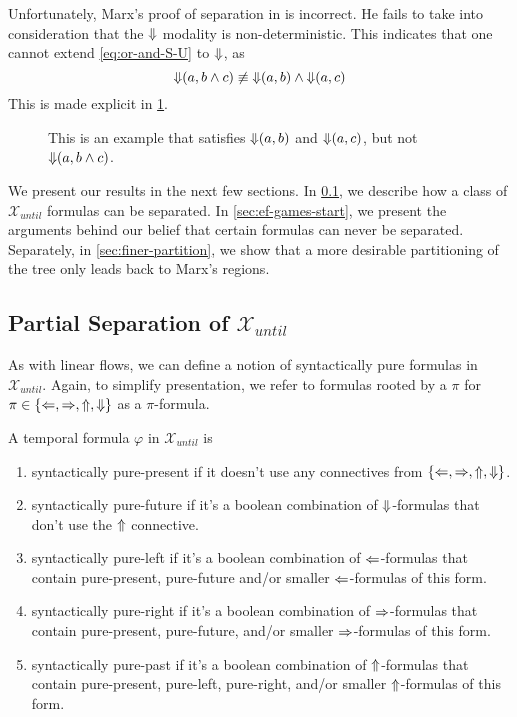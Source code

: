 \documentclass[a4paper,UKenglish,cleveref, autoref, thm-restate, numberwithinsect]{lipics-v2021}
\def\Larrow{\ensuremath\mathord{\Leftarrow}}
\def\Rarrow{\ensuremath\mathord{\Rightarrow}}
\def\Uarrow{\ensuremath\mathord{\Uparrow}}
\def\Darrow{\ensuremath\mathord{\Downarrow}}
\begin{document}
Unfortunately, Marx's proof of separation in \cite{xpathComplete} is incorrect. He fails to take into consideration that the $\Darrow$ modality is non-deterministic. This indicates that one cannot extend \cref{eq:or-and-S-U} to $\Darrow$, as
\begin{equation*}
    \Darrow(a, b \land c) \not\equiv \Darrow(a, b) \land \Darrow(a, c)
\end{equation*}
This is made explicit in \cref{fig:darrow-a-b-and-c}.
\begin{figure}[h]
    \centering
    \caption[]{This is an example that satisfies $\Darrow(a, b)$ and $\Darrow(a, c)$, but not $\Darrow(a, b \land c)$.}
    \label{fig:darrow-a-b-and-c}
\end{figure}

We present our results in the next few sections. In \cref{sec:partial-separation-start}, we describe how a class of $\mathcal{X}_{until}$ formulas can be separated. In \cref{sec:ef-games-start}, we present the arguments behind our belief that certain formulas can never be separated. Separately, in \cref{sec:finer-partition}, we show that a more desirable partitioning of the tree only leads back to Marx's regions.

\subsection{Partial Separation of $\mathcal{X}_{until}$}
\label{sec:partial-separation-start}

As with linear flows, we can define a notion of syntactically pure formulas in $\mathcal{X}_{until}$. Again, to simplify presentation, we refer to formulas rooted by a $\pi$ for $\pi \in \{\Larrow, \Rarrow, \Uarrow, \Darrow\}$ as a $\pi$-formula.
\begin{definition}
    A temporal formula $\varphi$ in $\mathcal{X}_{until}$ is
    \begin{enumerate}
        \item syntactically pure-present if it doesn't use any connectives from $\{\Larrow, \Rarrow, \Uarrow, \Darrow\}$.
        \item syntactically pure-future if it's a boolean combination of $\Darrow$-formulas that don't use the $\Uarrow$ connective.
        \item syntactically pure-left if it's a boolean combination of $\Larrow$-formulas that contain pure-present, pure-future and/or smaller $\Larrow$-formulas of this form.
        \item syntactically pure-right if it's a boolean combination of $\Rarrow$-formulas that contain pure-present, pure-future, and/or smaller $\Rarrow$-formulas of this form.
        \item syntactically pure-past if it's a boolean combination of $\Uarrow$-formulas that contain pure-present, pure-left, pure-right, and/or smaller $\Uarrow$-formulas of this form.
    \end{enumerate}
\end{definition}
\end{document}
